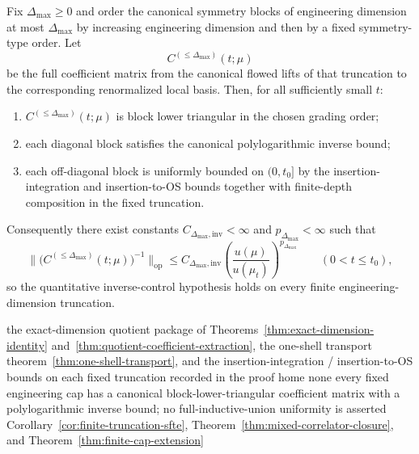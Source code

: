 
\begin{theorem}\label{thm:finite-truncation-inverse}
Fix $\Delta_{\max}\ge 0$ and order the canonical symmetry blocks of engineering dimension at most $\Delta_{\max}$ by increasing engineering dimension and then by a fixed symmetry-type order. Let
\[
C^{(\le \Delta_{\max})}(t;\mu)
\]
be the full coefficient matrix from the canonical flowed lifts of that truncation to the corresponding renormalized local basis. Then, for all sufficiently small $t$:
\begin{enumerate}[label=\textup{(\roman*)},leftmargin=2.25em]
\item $C^{(\le \Delta_{\max})}(t;\mu)$ is block lower triangular in the chosen grading order;
\item each diagonal block satisfies the canonical polylogarithmic inverse bound;
\item each off-diagonal block is uniformly bounded on $(0,t_0]$ by the insertion-integration and insertion-to-OS bounds together with finite-depth composition in the fixed truncation.
\end{enumerate}
Consequently there exist constants $C_{\Delta_{\max},\mathrm{inv}}<\infty$ and $p_{\Delta_{\max}}<\infty$ such that
\[
\bigl\|\bigl(C^{(\le \Delta_{\max})}(t;\mu)\bigr)^{-1}\bigr\|_{\mathrm{op}}
\le
C_{\Delta_{\max},\mathrm{inv}}\left(\frac{u(\mu)}{u(\mu_t)}\right)^{p_{\Delta_{\max}}}
\qquad (0<t\le t_0),
\]
so the quantitative inverse-control hypothesis holds on every finite engineering-dimension truncation.
\end{theorem}

\dependencyledger
  {the exact-dimension quotient package of Theorems~\ref{thm:exact-dimension-identity} and~\ref{thm:quotient-coefficient-extraction}, the one-shell transport theorem~\ref{thm:one-shell-transport}, and the insertion-integration / insertion-to-OS bounds on each fixed truncation recorded in the proof home}
  {none}
  {every fixed engineering cap has a canonical block-lower-triangular coefficient matrix with a polylogarithmic inverse bound; no full-inductive-union uniformity is asserted}
  {Corollary~\ref{cor:finite-truncation-sfte}, Theorem~\ref{thm:mixed-correlator-closure}, and Theorem~\ref{thm:finite-cap-extension}}

